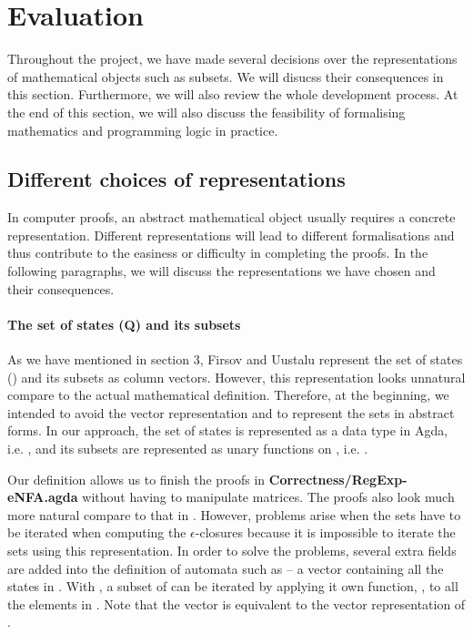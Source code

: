 \section{Evaluation}
\par Throughout the project, we have made several
decisions over the representations of mathematical objects such as
subsets. We will disucss their consequences in this
section. Furthermore, we will also review the whole development process. At the end of this section, we
will also discuss the feasibility of formalising mathematics and
programming logic in practice. 


\subsection{Different choices of representations}
\par In computer proofs, an abstract mathematical
object usually requires a concrete representation. Different representations will lead to different
formalisations and thus contribute to the
easiness or difficulty in completing the proofs. In the
following paragraphs, we will discuss the representations we have
chosen and their consequences. 

\paragraph{The set of states (Q) and its subsets} As we have mentioned
in section 3, Firsov and Uustalu \cite{firsov2013} represent the set of states () and its subsets
as column vectors. However, this representation looks unnatural compare
to the actual mathematical definition. Therefore, at the beginning, we intended to avoid the vector representation and to
represent the sets in abstract forms. In our approach, the set of states is represented as a data type in Agda, i.e. , and its
subsets are represented as unary functions on , i.e. . 

\par Our definition allows us to finish the proofs in
\textbf{Correctness/RegExp-eNFA.agda} without having to
manipulate matrices. The proofs also look much more natural compare to that in
\cite{firsov2013}. However, problems arise when the sets have to be iterated when computing the 
\(\epsilon\)-closures because it is impossible to iterate the sets
using this representation. In order to solve the problems, several
extra fields are added into the definition of automata such as 
-- a vector containing all the states in . With , a subset
of  can be iterated by applying it own function, , to all the elements in . Note that the vector 
is equivalent to the vector representation of . 

